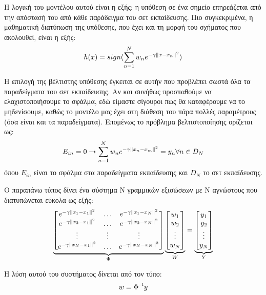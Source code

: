 Η λογική του  μοντέλου αυτού είναι η εξής: η υπόθεση σε ένα σημείο επηρεάζεται από την απόστασή του από κάθε παράδειγμα του σετ εκπαίδευσης. Πιο συγκεκριμένα, η μαθηματική διατύπωση της υπόθεσης, που έχει και τη μορφή του σχήματος που ακολουθεί, είναι η εξής:
\begin{equation}
h(x)= sign( \sum_{n=1}^{N} w_n e^{-\gamma \left\lVert x - x_n\right\rVert^2})
\end{equation}

Η επιλογή της βέλτιστης υπόθεσης έγκειται σε αυτήν που προβλέπει σωστά όλα τα παραδείγματα του σετ εκπαίδευσης. Αν και συνήθως προσπαθούμε να ελαχιστοποιήσουμε το σφάλμα, εδώ είμαστε σίγουροι πως θα καταφέρουμε να το μηδενίσουμε, καθώς το μοντέλο μας έχει στη διάθεση του πάρα πολλές παραμέτρους (όσα είναι και τα παραδείγματα). Επομένως το πρόβλημα βελτιστοποίησης ορίζεται ως:
\begin{equation}
E_{in}=0 \rightarrow  \sum_{n=1}^{N} w_n e^{-\gamma \left\lVert x_n - x_m\right\rVert^2}= y_n  \forall n \in D_N 
\end{equation}
όπου $E_{in}$ είναι το σφάλμα στα παραδείγματα εκπαίδευσης και $D_N$ το σετ εκπαίδευσης. 

Ο παραπάνω τύπος δίνει ένα σύστημα Ν γραμμικών εξισώσεων με Ν αγνώστους που διατυπώνεται εύκολα ως εξής:
\[
\underbrace{
	\begin{bmatrix}
	e^{-\gamma \left\lVert x_1 - x_1\right\rVert^2}  & \dots  &  e^{-\gamma \left\lVert x_1 - x_N\right\rVert^2} \\
	e^{-\gamma \left\lVert x_2 - x_1\right\rVert^2}  & \dots  &  e^{-\gamma \left\lVert x_2 - x_N\right\rVert^2} \\
	\vdots  & \vdots & \vdots \\
	e^{-\gamma \left\lVert x_N - x_1\right\rVert^2}  & \dots  &  e^{-\gamma \left\lVert x_N - x_N\right\rVert^2} \\
	\end{bmatrix}}_{  \Phi}
\underbrace{
	\begin{bmatrix}
	w_{1}       \\
	w_{2}        \\
	\vdots        \\
	w_{N}
	\end{bmatrix}}_{W}
=
\underbrace{
	\begin{bmatrix}
	y_{1}       \\
	y_{2}        \\
	\vdots        \\
	y_{N}
	\end{bmatrix}}_{Y}
\]

Η λύση αυτού του συστήματος δίνεται από τον τύπο:
\begin{equation}
w=\inv{\Phi} y
\end{equation}

